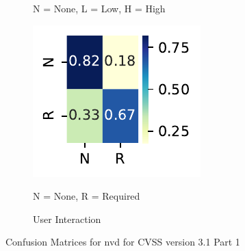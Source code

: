 \documentclass[12pt]{article}
\begin{document}
\begin{figure}
\begin{subfigure}[t]{0.45\textwidth}
		\begin{tablenotes}
			\footnotesize
			\item \quad N = None, L = Low, H = High
		\end{tablenotes}
	\end{subfigure}
	\hfill
	\begin{subfigure}[t]{0.45\textwidth}
		\includegraphics[width=\textwidth]{./figures/confusion_matrices/user_interaction_nvd.pdf}

		\caption{User Interaction}
		\begin{tablenotes}
			\footnotesize
			\item \quad N = None, R = Required
		\end{tablenotes}
	\end{subfigure}

	\caption{\label{fig:nvd_31_confusion_matrices_1}Confusion Matrices for nvd for CVSS version 3.1 Part 1}
\end{figure}
\end{document}
